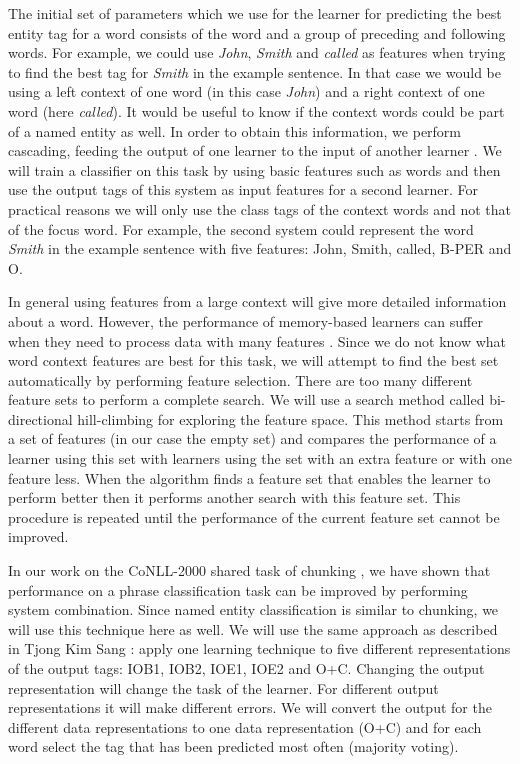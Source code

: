 \documentclass[11pt]{article}
\begin{document}
The initial set of parameters which we use for the learner for
predicting the best entity tag for a word consists of the word and a
group of preceding and following words.
For example, we could use {\it John}, {\it Smith} and {\it called}
as features when trying to find the best tag for {\it Smith} in the
example sentence.
In that case we would be using a left context of one word (in this
case {\it John}) and a right context of one word (here {\it called}).
It would be useful to know if the context words could be part of a
named entity as well.
In order to obtain this information, we perform {\sc cascading},
feeding the output of one learner to the input of another learner
\cite{veenstra98}.
We will train a classifier on this task by using basic features such
as words and then use the output tags of this system as input features
for a second learner.
For practical reasons we will only use the class tags of the context
words and not that of the focus word.
For example, the second system could represent the word {\it Smith}
in the example sentence with five features: 
John, Smith, called, B-PER and O.

In general using features from a large context will give more
detailed information about a word.
However, the performance of memory-based learners can suffer when they
need to process data with many features \cite{tks2002jmlr}.
Since we do not know what word context features are best for this
task, we will attempt to find the best set automatically by performing
{\sc feature selection}.
There are too many different feature sets to perform a complete
search.
We will use a search method called bi-directional hill-climbing
\cite{caruana94} for exploring the feature space.
This method starts from a set of features (in our case the empty set)
and compares the performance of a learner using this set with learners
using the set with an extra feature or with one feature less.
When the algorithm finds a feature set that enables the learner to
perform better then it performs another search with this feature set.
This procedure is repeated until the performance of the current
feature set cannot be improved.

In our work on the CoNLL-2000 shared task of chunking
\cite{tks2002jmlr}, we have shown that performance on a phrase
classification task can be improved by performing {\sc system
combination}.
Since named entity classification is similar to chunking, we will use
this technique here as well.
We will use the same approach as described in Tjong Kim Sang
: apply one learning technique to five
different representations of the output tags: IOB1, IOB2, IOE1, IOE2
and O+C.
Changing the output representation will change the task of the
learner.
For different output representations it will make different errors.
We will convert the output for the different data representations to 
one data representation (O+C) and for each word select the
tag that has been predicted most often (majority voting).
\end{document}
